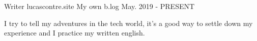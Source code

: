 

\begin{cventries}

  \cventry
  {Writer} %
  {lucascontre.site} %
  {My own b.log} %
  {May. 2019 - PRESENT} %
  {
  \begin{cvitems} %
    \item {I try to tell my adventures in the tech world, it's a good way to settle down my experience and I practice my written english.}
  \end{cvitems}
  }


\end{cventries}
